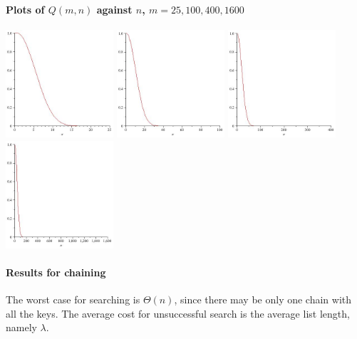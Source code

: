 \paragraph{Plots of $Q(m, n)$ against $n$, $m=25,100,400,1600$}
\includegraphics[width=4cm]{figs/birthday25.jpg}
\includegraphics[width=4cm]{figs/birthday100.jpg}
% 
\includegraphics[width=4cm]{figs/birthday400.jpg}
\includegraphics[width=4cm]{figs/birthday1600.jpg}


\paragraph{Results for chaining}

The worst case for searching is $\Theta(n)$, since there may be only one 
chain with all the keys. The average cost for unsuccessful search is the average list length, 
namely $\lambda$.

